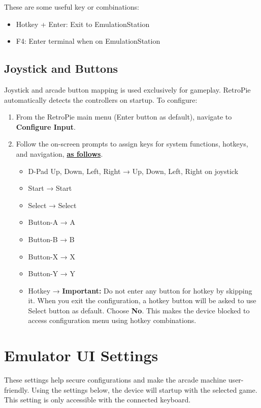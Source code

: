 These are some useful key or combinations:
\begin{itemize}
  \item Hotkey + Enter: Exit to EmulationStation
  \item F4: Enter terminal when on EmulationStation
\end{itemize}

\subsection{Joystick and Buttons}
\label{subsec:joystick_buttons}

Joystick and arcade button mapping is used exclusively for gameplay. RetroPie automatically detects the controllers on startup. To configure:

\begin{enumerate}
  \item From the RetroPie main menu (Enter button as default), navigate to \textbf{Configure Input}.
  \item Follow the on-screen prompts to assign keys for system functions, hotkeys, and navigation, \textbf{\underline{as follows}}.
    \begin{itemize}
      \item D-Pad Up, Down, Left, Right → Up, Down, Left, Right on joystick
      \item Start → Start
      \item Select → Select
      \item Button-A → A
      \item Button-B → B
      \item Button-X → X
      \item Button-Y → Y
      \item Hotkey → \textbf{Important:} Do not enter any button for hotkey by skipping it. When you exit the configuration, a hotkey button will be asked to use Select button as default. Choose \textbf{No}. This makes the device blocked to access configuration menu using hotkey combinations.
    \end{itemize}
\end{enumerate}

\section{Emulator UI Settings}
\label{sec:emulator_settings}

These settings help secure configurations and make the arcade machine user-friendly. Using the settings below, the device will startup with the selected game. This setting is only accessible with the connected keyboard.

